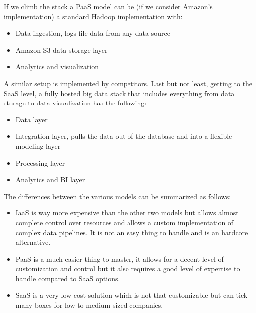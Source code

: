 If we climb the stack a PaaS model can be (if we consider Amazon's implementation) a standard Hadoop implementation with:
\begin{itemize}
    \item Data ingestion, logs file data from any data source
    \item Amazon S3 data storage layer
    \item Analytics and visualization
\end{itemize}
A similar setup is implemented by competitors. \n
Last but not least, getting to the SaaS level, a fully hosted big data stack that includes everything from data storage to data visualization has the following:
\begin{itemize}
    \item Data layer
    \item Integration layer, pulls the data out of the database and into a flexible modeling layer
    \item Processing layer
    \item Analytics and BI layer
\end{itemize}
The differences between the various models can be summarized as follows:
\begin{itemize}
    \item IaaS is way more expensive than the other two models but allows almost complete control over resources and allows a custom implementation of complex data pipelines. It is not an easy thing to handle and is an hardcore alternative.
    \item PaaS is a much easier thing to master, it allows for a decent level of customization and control but it also requires a good level of expertise to handle compared to SaaS options.
    \item SaaS is a very low cost solution which is not that customizable but can tick many boxes for low to medium sized companies.
\end{itemize}
